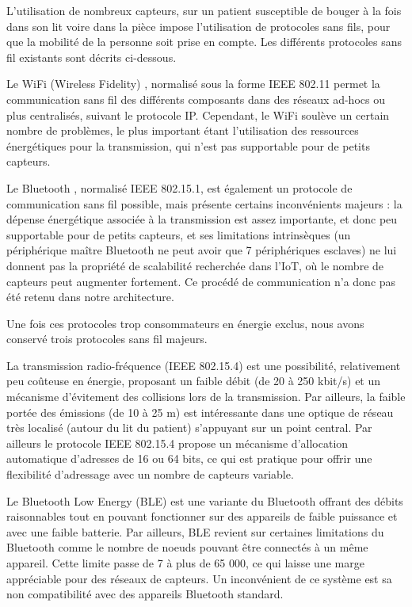 \documentclass{article}
\begin{document}
L’utilisation de nombreux capteurs, sur un patient susceptible de bouger à la fois dans son lit voire dans la pièce impose l’utilisation de protocoles sans fils, pour que la mobilité de la personne soit prise en compte. Les différents protocoles sans fil existants sont décrits ci-dessous.

Le WiFi (Wireless Fidelity) \cite{Wifi}, normalisé sous la forme IEEE 802.11 permet la communication sans fil des différents composants dans des réseaux ad-hocs ou plus centralisés, suivant le protocole IP. Cependant, le WiFi soulève un certain nombre de problèmes, le plus important étant l'utilisation des ressources énergétiques pour la transmission, qui n’est pas supportable pour de petits capteurs.

Le Bluetooth \cite{Bluetooth}, normalisé IEEE 802.15.1, est également un protocole de communication sans fil possible, mais présente certains inconvénients majeurs : la dépense énergétique associée à la transmission est assez importante, et donc peu supportable pour de petits capteurs, et ses limitations intrinsèques (un périphérique maître Bluetooth ne peut avoir que 7 périphériques esclaves) ne lui donnent pas la propriété de scalabilité recherchée dans l'IoT, où le nombre de capteurs peut augmenter fortement. Ce procédé de communication n'a donc pas été retenu dans notre architecture.

Une fois ces protocoles trop consommateurs en énergie exclus, nous avons conservé trois protocoles sans fil majeurs.

La transmission radio-fréquence (IEEE 802.15.4) \cite{1IEEE802.15.4} \cite{2IEEE802.15.4} est une possibilité, relativement peu coûteuse en énergie, proposant un faible débit (de 20 à 250 kbit/s) et un mécanisme d’évitement des collisions lors de la transmission. Par ailleurs, la faible portée des émissions (de 10 à 25 m) est intéressante dans une optique de réseau très localisé (autour du lit du patient) s’appuyant sur un point central. Par ailleurs le protocole IEEE 802.15.4 propose un mécanisme d’allocation automatique d’adresses de 16 ou 64 bits, ce qui est pratique pour offrir une flexibilité d’adressage avec un nombre de capteurs variable.

Le Bluetooth Low Energy (BLE) \cite{BLE} est une variante du Bluetooth offrant des débits raisonnables tout en pouvant fonctionner sur des appareils de faible puissance et avec une faible batterie. Par ailleurs, BLE revient sur certaines limitations du Bluetooth comme le nombre de noeuds pouvant être connectés à un même appareil. Cette limite passe de 7 à plus de 65 000, ce qui laisse une marge appréciable pour des réseaux de capteurs. Un inconvénient de ce système est sa non compatibilité avec des appareils Bluetooth standard.
\end{document}
